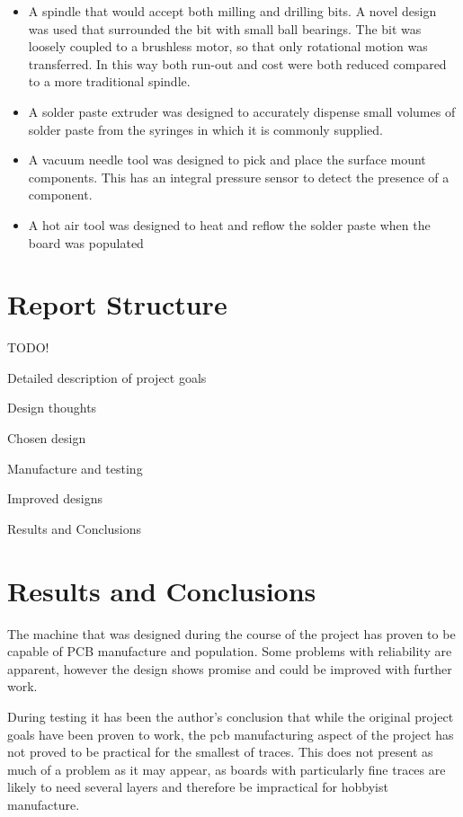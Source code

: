 \documentclass[a4paper,11pt]{article}  %
\begin{document}
\begin{itemize}\itemsep0em
\item
A spindle that would accept both milling and drilling bits. A novel design
was used that surrounded the bit with small ball bearings. The bit was loosely
coupled to a brushless motor, so that only rotational motion was transferred.
In this way both run-out and cost were both reduced compared to a more
traditional spindle.
\item
A solder paste extruder was designed to accurately dispense small volumes
of solder paste from the syringes in which it is commonly supplied.
\item
A vacuum needle tool was designed to pick and place the surface mount
components. This has an integral pressure sensor to detect the presence of
a component.
\item
A hot air tool was designed to heat and reflow the solder paste when the board
was populated
\end{itemize}

\section*{Report Structure}
TODO!

Detailed description of project goals

Design thoughts

Chosen design

Manufacture and testing

Improved designs

Results and Conclusions

\section*{Results and Conclusions}
The machine that was designed during the course of the project has proven
to be capable of PCB manufacture and population. Some problems with
reliability are apparent, however the design shows promise and could be
improved with further work.

During testing it has been the author's conclusion that while the original
project goals have been proven to work, the pcb manufacturing aspect of the
project has not proved to be practical for the smallest of traces. This
does not present as much of a problem as it may appear, as boards with particularly fine
traces are likely to need several layers and therefore be impractical for
hobbyist manufacture.
\end{document}
